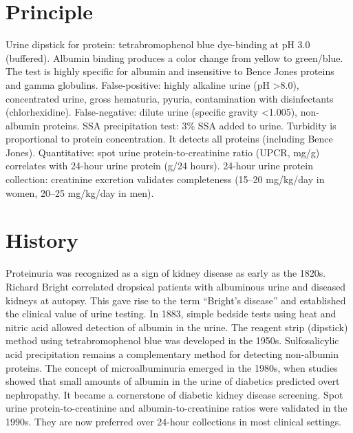 \section*{Principle}
Urine dipstick for protein: tetrabromophenol blue dye-binding at pH 3.0 (buffered). Albumin binding produces a color change from yellow to green/blue. The test is highly specific for albumin and insensitive to Bence Jones proteins and gamma globulins. False-positive: highly alkaline urine (pH >8.0), concentrated urine, gross hematuria, pyuria, contamination with disinfectants (chlorhexidine). False-negative: dilute urine (specific gravity <1.005), non-albumin proteins. SSA precipitation test: 3\% SSA added to urine. Turbidity is proportional to protein concentration. It detects all proteins (including Bence Jones). Quantitative: spot urine protein-to-creatinine ratio (UPCR, mg/g) correlates with 24-hour urine protein (g/24 hours). 24-hour urine protein collection: creatinine excretion validates completeness (15--20 mg/kg/day in women, 20--25 mg/kg/day in men).
\section*{History}
Proteinuria was recognized as a sign of kidney disease as early as the 1820s. Richard Bright correlated dropsical patients with albuminous urine and diseased kidneys at autopsy. This gave rise to the term ``Bright's disease'' and established the clinical value of urine testing. In 1883, simple bedside tests using heat and nitric acid allowed detection of albumin in the urine. The reagent strip (dipstick) method using tetrabromophenol blue was developed in the 1950s. Sulfosalicylic acid precipitation remains a complementary method for detecting non-albumin proteins. The concept of microalbuminuria emerged in the 1980s, when studies showed that small amounts of albumin in the urine of diabetics predicted overt nephropathy. It became a cornerstone of diabetic kidney disease screening. Spot urine protein-to-creatinine and albumin-to-creatinine ratios were validated in the 1990s. They are now preferred over 24-hour collections in most clinical settings.
